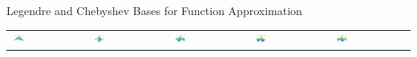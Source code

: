 \documentclass[11pt,compress,xcolor={usenames,dvipsnames},aspectratio=169]{beamer}
\begin{document}
\begin{frame}{Legendre and Chebyshev Bases for Function Approximation}
\begin{tabular}{>{\centering}m{}>{\centering}m{}>{\centering}m{}>{\centering}m{}>{\centering}m{}}
\includegraphics[width =0.18\textwidth]{ProgramsImages/Chebyshev_Degree_1_1.png}  &
\includegraphics[width =0.18\textwidth]{ProgramsImages/Chebyshev_Degree_1_2.png}  &
\includegraphics[width =0.18\textwidth]{ProgramsImages/Chebyshev_Degree_1_3.png}  &
\includegraphics[width =0.18\textwidth]{ProgramsImages/Chebyshev_Degree_2_2.png}  &
\includegraphics[width =0.18\textwidth]{ProgramsImages/Chebyshev_Degree_2_3.png} 
	\end{tabular}
\end{frame}
\end{document}
